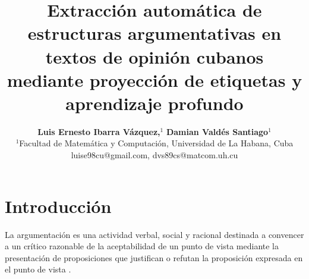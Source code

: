 \documentclass[a4paper,11pt,twocolumn,twoside]{article}
\title{Extracción automática de estructuras argumentativas en textos de opinión cubanos mediante proyección de etiquetas y aprendizaje profundo}
\author {\textbf{Luis Ernesto Ibarra Vázquez,$^1$} \textbf{Damian Valdés Santiago$^1$}\\
$^1$Facultad de Matemática y Computación, Universidad de La Habana, Cuba\\
luise98cu@gmail.com, dvs89cs@matcom.uh.cu\\
}
\begin{document}

\setlength\titlebox{22cm} %


\label{firstpage} \maketitle

%

\section{Introducción}


La argumentación es una actividad verbal, social y racional destinada a convencer 
a un crítico razonable de la aceptabilidad de un punto de vista mediante la presentación 
de proposiciones que justifican o refutan la proposición expresada 
en el punto de vista \cite{van2004systematic}. 



\end{document}
